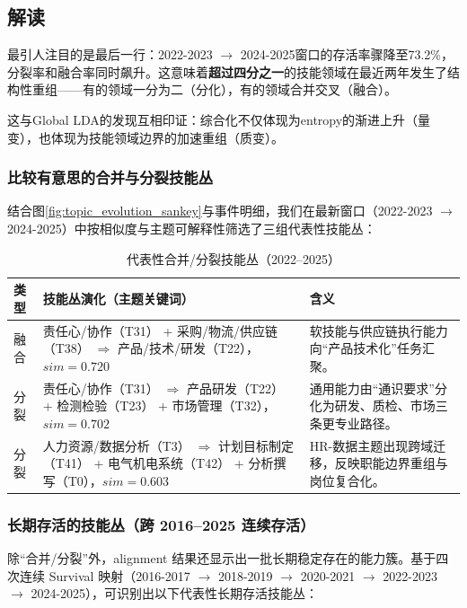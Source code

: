 \documentclass[12pt, a4paper, fontset=none]{ctexart}
\begin{document}
\subsection{解读}

最引人注目的是最后一行：2022-2023 $\rightarrow$ 2024-2025窗口的存活率骤降至73.2\%，分裂率和融合率同时飙升。这意味着\textbf{超过四分之一}的技能领域在最近两年发生了结构性重组——有的领域一分为二（分化），有的领域合并交叉（融合）。

这与Global LDA的发现互相印证：综合化不仅体现为entropy的渐进上升（量变），也体现为技能领域边界的加速重组（质变）。

\subsubsection{比较有意思的合并与分裂技能丛}

结合图\ref{fig:topic_evolution_sankey}与事件明细，我们在最新窗口（2022-2023 $\rightarrow$ 2024-2025）中按相似度与主题可解释性筛选了三组代表性技能丛：

\begin{table}[H]
\centering
\caption{代表性合并/分裂技能丛（2022--2025）}
\begin{tabular}{p{}p{}p{}}
\toprule
\textbf{类型} & \textbf{技能丛演化（主题关键词）} & \textbf{含义} \\
\midrule
融合 & 责任心/协作（T31） + 采购/物流/供应链（T38） $\Rightarrow$ 产品/技术/研发（T22），$sim=0.720$ & 软技能与供应链执行能力向“产品技术化”任务汇聚。 \\
分裂 & 责任心/协作（T31） $\Rightarrow$ 产品研发（T22） + 检测检验（T23） + 市场管理（T32），$sim=0.702$ & 通用能力由“通识要求”分化为研发、质检、市场三条更专业路径。 \\
分裂 & 人力资源/数据分析（T3） $\Rightarrow$ 计划目标制定（T41） + 电气机电系统（T42） + 分析撰写（T0），$sim=0.603$ & HR-数据主题出现跨域迁移，反映职能边界重组与岗位复合化。 \\
\bottomrule
\end{tabular}
\end{table}

\subsubsection{长期存活的技能丛（跨 2016--2025 连续存活）}

除“合并/分裂”外，alignment 结果还显示出一批长期稳定存在的能力簇。基于四次连续 Survival 映射（2016-2017 $\rightarrow$ 2018-2019 $\rightarrow$ 2020-2021 $\rightarrow$ 2022-2023 $\rightarrow$ 2024-2025），可识别出以下代表性长期存活技能丛：
\end{document}
